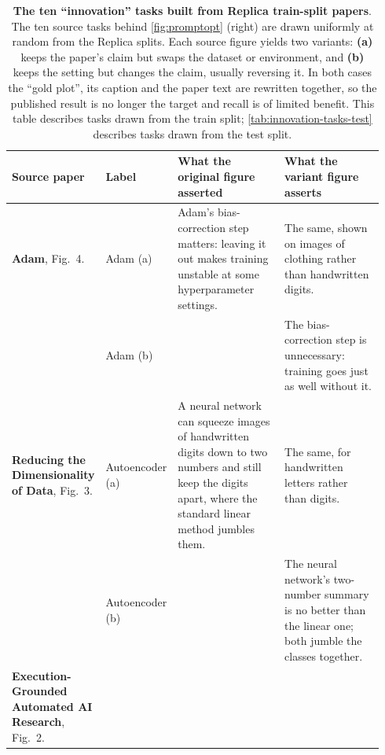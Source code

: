 \documentclass[garamond,a4paper]{inherent}
\begin{document}
\begin{table}[htbp]
    \centering
    \caption{\textbf{The ten ``innovation'' tasks built from Replica train-split papers}.
The ten source tasks behind \autoref{fig:promptopt} (right) are drawn uniformly at random from the Replica splits.
Each source figure yields two variants: \textbf{(a)} keeps the paper's claim but swaps the dataset or environment, and \textbf{(b)} keeps the setting but changes the claim, usually reversing it.
In both cases the ``gold plot'', its caption and the paper text are rewritten together, so the published result is no longer the target and recall is of limited benefit. This table describes tasks drawn from the train split;  \autoref{tab:innovation-tasks-test} describes tasks drawn from the test split.
    }
    \label{tab:innovation-tasks}
    \footnotesize
    \renewcommand{\arraystretch}{1.05}
    \setlength{\tabcolsep}{3pt}
    \begin{tabular}{@{}>{\raggedright\arraybackslash}p{0.165\linewidth} >{\raggedright\arraybackslash}p{0.105\linewidth} >{\raggedright\arraybackslash}p{0.335\linewidth} >{\raggedright\arraybackslash}p{0.335\linewidth}@{}}
        \toprule
        \textbf{Source paper} & \textbf{Label} & \textbf{What the original figure asserted} & \textbf{What the variant figure asserts} \\
        \midrule
        \textbf{Adam}\newline\cite{kingma2014adam}, Fig.~4.
        & Adam (a) & Adam's bias-correction step matters: leaving it out makes training unstable at some hyperparameter settings. & The same, shown on images of clothing rather than handwritten digits. \\
        & Adam (b) & & The bias-correction step is unnecessary: training goes just as well without it. \\
        \addlinespace[3pt]
        \textbf{Reducing the Dimensionality of Data}\newline\cite{hinton2006reducing}, Fig.~3.
        & Autoencoder (a) & A neural network can squeeze images of handwritten digits down to two numbers and still keep the digits apart, where the standard linear method jumbles them. & The same, for handwritten letters rather than digits. \\
        & Autoencoder (b) & & The neural network's two-number summary is no better than the linear one; both jumble the classes together. \\
        \addlinespace[3pt]
        \textbf{Execution-Grounded Automated AI Research}\newline\cite{si2026execution}, Fig.~2.

\end{tabular}
\end{table}
\end{document}
